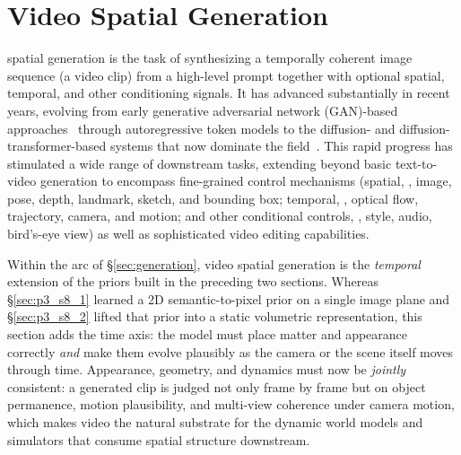 \section{Video Spatial Generation}
\label{sec:p3_s8_3}

 spatial generation is the task of synthesizing a temporally coherent image sequence (a video clip) from a high-level prompt together with optional spatial, temporal, and other conditioning signals.
It has advanced substantially in recent years, evolving from early generative adversarial network (GAN)-based approaches~\cite{goodfellow2014gan} through autoregressive token models to the diffusion- and diffusion-transformer-based systems that now dominate the field~\cite{polyak2024movie,hong2022cogvideo,wan2025wan,sora2024}.
This rapid progress has stimulated a wide range of downstream tasks, extending beyond basic text-to-video generation to encompass fine-grained control mechanisms (spatial, \eg, image, pose, depth, landmark, sketch, and bounding box; temporal, \eg, optical flow, trajectory, camera, and motion; and other conditional controls, \eg, style, audio, bird's-eye view) as well as sophisticated video editing capabilities.

Within the arc of §\ref{sec:generation}, video spatial generation is the \emph{temporal} extension of the priors built in the preceding two sections.
Whereas §\ref{sec:p3_s8_1} learned a 2D semantic-to-pixel prior on a single image plane and §\ref{sec:p3_s8_2} lifted that prior into a static volumetric representation, this section adds the time axis: the model must place matter and appearance correctly \emph{and} make them evolve plausibly as the camera or the scene itself moves through time.
Appearance, geometry, and dynamics must now be \emph{jointly} consistent: a generated clip is judged not only frame by frame but on object permanence, motion plausibility, and multi-view coherence under camera motion, which makes video the natural substrate for the dynamic world models and simulators that consume spatial structure downstream.

